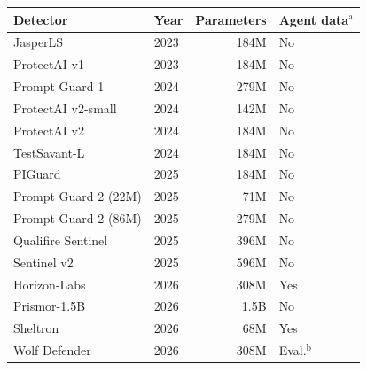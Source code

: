 \begin{tabular*}{\columnwidth}{@{\extracolsep{\fill}}llrl@{}}
\toprule
Detector & Year & Parameters & Agent data$^{\mathrm{a}}$ \\
\midrule
JasperLS & 2023 & 184M & No \\
ProtectAI v1 & 2023 & 184M & No \\
Prompt Guard 1 & 2024 & 279M & No \\
ProtectAI v2-small & 2024 & 142M & No \\
ProtectAI v2 & 2024 & 184M & No \\
TestSavant-L & 2024 & 184M & No \\
PIGuard & 2025 & 184M & No \\
Prompt Guard 2 (22M) & 2025 & 71M & No \\
Prompt Guard 2 (86M) & 2025 & 279M & No \\
Qualifire Sentinel & 2025 & 396M & No \\
Sentinel v2 & 2025 & 596M & No \\
Horizon-Labs & 2026 & 308M & Yes \\
Prismor-1.5B & 2026 & 1.5B & No \\
Sheltron & 2026 & 68M & Yes \\
Wolf Defender & 2026 & 308M & Eval.$^{\mathrm{b}}$ \\
\bottomrule
\end{tabular*}
